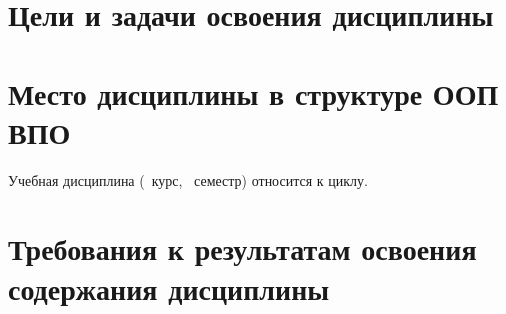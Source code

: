 






\section{Цели и задачи освоения дисциплины}

\section{Место дисциплины в структуре ООП ВПО}


	\ssect Учебная дисциплина \thecourse{}
(\theyearofstudy~курс, \theterm~семестр) относится к 
циклу.

	\ssect %

	\ssect %

\section{Требования к результатам освоения содержания дисциплины}


